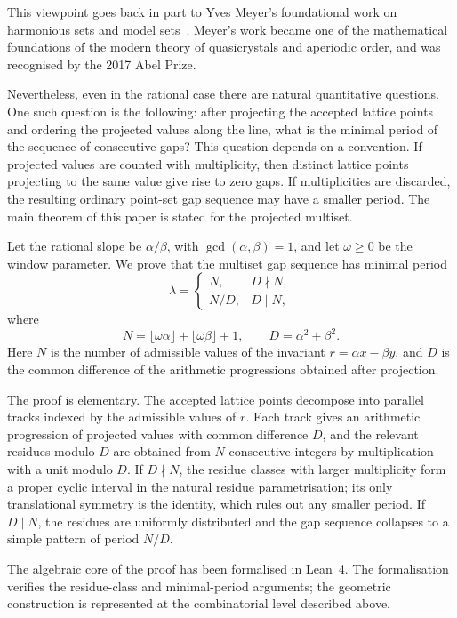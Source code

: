 \documentclass[11pt]{article}
\theoremstyle{plain}
\theoremstyle{definition}
\theoremstyle{remark}
\begin{document}
This viewpoint goes back in part to Yves Meyer's foundational work on
harmonious sets and model sets~\cite{Meyer1972}.  Meyer's work became one
of the mathematical foundations of the modern theory of quasicrystals and
aperiodic order, and was recognised by the 2017 Abel Prize.

Nevertheless, even in the rational case there are natural quantitative
questions.  One such question is the following: after projecting the accepted
lattice points and ordering the projected values along the line, what is the
minimal period of the sequence of consecutive gaps?  This question depends
on a convention.  If projected values are counted with multiplicity, then
distinct lattice points projecting to the same value give rise to zero gaps.
If multiplicities are discarded, the resulting ordinary point-set gap
sequence may have a smaller period.  The main theorem of this paper is
stated for the projected multiset.

Let the rational slope be \(\alpha/\beta\), with
\(\gcd(\alpha,\beta)=1\), and let \(\omega\ge0\) be the window parameter.
We prove that the multiset gap sequence has minimal period
\[
    \lambda =
    \begin{cases}
        N, & D\nmid N,\\[3pt]
        N/D, & D\mid N,
    \end{cases}
\]
where
\[
    N=\lfloor\omega\alpha\rfloor+\lfloor\omega\beta\rfloor+1,
    \qquad
    D=\alpha^2+\beta^2.
\]
Here \(N\) is the number of admissible values of the invariant
\(r=\alpha x-\beta y\), and \(D\) is the common difference of the arithmetic
progressions obtained after projection.

The proof is elementary.  The accepted lattice points decompose into
parallel tracks indexed by the admissible values of \(r\).  Each track gives
an arithmetic progression of projected values with common difference \(D\),
and the relevant residues modulo \(D\) are obtained from \(N\) consecutive
integers by multiplication with a unit modulo \(D\).  If \(D\nmid N\), the
residue classes with larger multiplicity form a proper cyclic interval in
the natural residue parametrisation; its only translational symmetry is the
identity, which rules out any smaller period.  If \(D\mid N\), the residues
are uniformly distributed and the gap sequence collapses to a simple pattern
of period \(N/D\).

The algebraic core of the proof has been formalised in Lean~4.  The
formalisation verifies the residue-class and minimal-period arguments; the
geometric construction is represented at the combinatorial level described
above.
\end{document}
